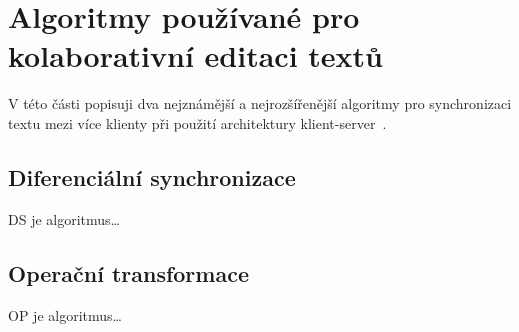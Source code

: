 
\section{Algoritmy používané pro kolaborativní editaci textů}\label{sec:algoritmyProKolaborativníEditaci}

V této části popisuji dva nejznámější a nejrozšířenější algoritmy pro synchronizaci textu mezi více klienty při použití architektury klient-server~\cite{algoritmy:first}.

\subsection{Diferenciální synchronizace}\label{subsec:diferencialniSynchronizace}

\gls{DS} je algoritmus\ldots

\subsection{Operační transformace}\label{subsec:operacniTransformace}

\gls{OP} je algoritmus\ldots

